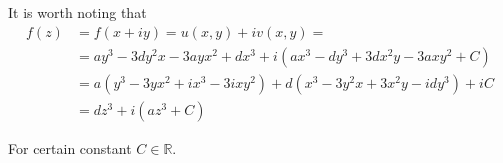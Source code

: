\documentclass[12pt, a4paper]{article}
\theoremstyle{definition}
\theoremstyle{remark}
\newcommand{\bb}[1]{\mathbb{#1}}
\begin{document}
It is worth noting that 
\begin{equation} \label{eq1}
\begin{split}
	f(z) &= f(x+iy) = u(x,y) + iv(x,y)  = \\
		 & =  ay^3  -3dy^2x -3ayx^2 +dx^3 + i(ax^3 - dy^3 + 3dx^2y -3axy^2 + C)\\
		 & = a(y^3 - 3yx^2 +ix^3 -3ixy^2) +d(x^3 -3y^2x +3x^2y -idy^3) + iC\\
		 & = dz^3 + i(az^3 + C)   
\end{split}
\end{equation}

For certain constant $C \in \bb{R}$.
\end{document}
